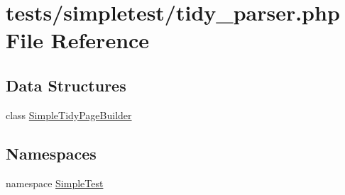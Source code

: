 \hypertarget{tidy__parser_8php}{\section{tests/simpletest/tidy\-\_\-parser.php File Reference}
\label{tidy__parser_8php}
}
\subsection*{Data Structures}
\begin{DoxyCompactItemize}
\item 
class \hyperlink{class_simple_tidy_page_builder}{Simple\-Tidy\-Page\-Builder}
\end{DoxyCompactItemize}
\subsection*{Namespaces}
\begin{DoxyCompactItemize}
\item 
namespace \hyperlink{namespace_simple_test}{Simple\-Test}
\end{DoxyCompactItemize}
